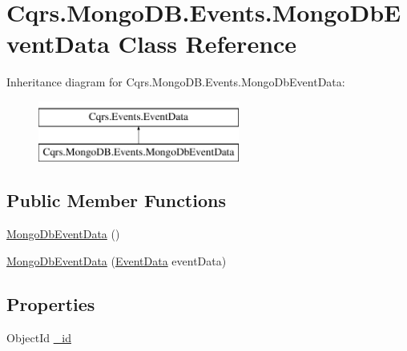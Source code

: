 \hypertarget{classCqrs_1_1MongoDB_1_1Events_1_1MongoDbEventData}{}\section{Cqrs.\+Mongo\+D\+B.\+Events.\+Mongo\+Db\+Event\+Data Class Reference}
\label{classCqrs_1_1MongoDB_1_1Events_1_1MongoDbEventData}
Inheritance diagram for Cqrs.\+Mongo\+D\+B.\+Events.\+Mongo\+Db\+Event\+Data\+:\begin{figure}[H]
\begin{center}
\leavevmode
\includegraphics[height=2.000000cm]{classCqrs_1_1MongoDB_1_1Events_1_1MongoDbEventData}
\end{center}
\end{figure}
\subsection*{Public Member Functions}
\begin{DoxyCompactItemize}
\item 
\hyperlink{classCqrs_1_1MongoDB_1_1Events_1_1MongoDbEventData_a3e0d14163cbc3e11505d63b15ddd1337_a3e0d14163cbc3e11505d63b15ddd1337}{Mongo\+Db\+Event\+Data} ()
\item 
\hyperlink{classCqrs_1_1MongoDB_1_1Events_1_1MongoDbEventData_acdd39bdfc67a9becd0734f4bf056b74b_acdd39bdfc67a9becd0734f4bf056b74b}{Mongo\+Db\+Event\+Data} (\hyperlink{classCqrs_1_1Events_1_1EventData}{Event\+Data} event\+Data)
\end{DoxyCompactItemize}
\subsection*{Properties}
\begin{DoxyCompactItemize}
\item 
Object\+Id \hyperlink{classCqrs_1_1MongoDB_1_1Events_1_1MongoDbEventData_a5650b3e9bac3dd255e8267394e67749a_a5650b3e9bac3dd255e8267394e67749a}{\+\_\+id}
\end{DoxyCompactItemize}


